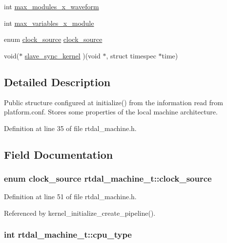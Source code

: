 \begin{DoxyCompactItemize}
int \hyperlink{structrtdal__machine__t_aafd6d2ebe38ab2ee2cfd797f5b04d803}{max\-\_\-modules\-\_\-x\-\_\-waveform}
\item 
int \hyperlink{structrtdal__machine__t_a98e1bf5ec3f8f2ad275f6783a8ee4df0}{max\-\_\-variables\-\_\-x\-\_\-module}
\item 
enum \hyperlink{rtdal__machine_8h_ae3207ac3ee92ebabbedaf232dc628466}{clock\-\_\-source} \hyperlink{structrtdal__machine__t_aec12eaf8d54297586aa5c2baa53a49a5}{clock\-\_\-source}
\item 
void($\ast$ \hyperlink{structrtdal__machine__t_ae38315c451db255d9108192ab2fbfe3d}{slave\-\_\-sync\-\_\-kernel} )(void $\ast$, struct timespec $\ast$time)
\end{DoxyCompactItemize}


\subsection{Detailed Description}
Public structure configured at initialize() from the information read from platform.\-conf. Stores some properties of the local machine architecture. 

Definition at line 35 of file rtdal\-\_\-machine.\-h.



\subsection{Field Documentation}
\hypertarget{structrtdal__machine__t_aec12eaf8d54297586aa5c2baa53a49a5}{
\subsubsection[{clock\-\_\-source}]{\setlength{\rightskip}{0pt plus 5cm}enum {\bf clock\-\_\-source} rtdal\-\_\-machine\-\_\-t\-::clock\-\_\-source}}\label{structrtdal__machine__t_aec12eaf8d54297586aa5c2baa53a49a5}


Definition at line 51 of file rtdal\-\_\-machine.\-h.



Referenced by kernel\-\_\-initialize\-\_\-create\-\_\-pipeline().

\hypertarget{structrtdal__machine__t_a2ce333c9436e5b4ab47b7560ba5cee1d}{
\subsubsection[{cpu\-\_\-type}]{\setlength{\rightskip}{0pt plus 5cm}int rtdal\-\_\-machine\-\_\-t\-::cpu\-\_\-type}}\label{structrtdal__machine__t_a2ce333c9436e5b4ab47b7560ba5cee1d}


